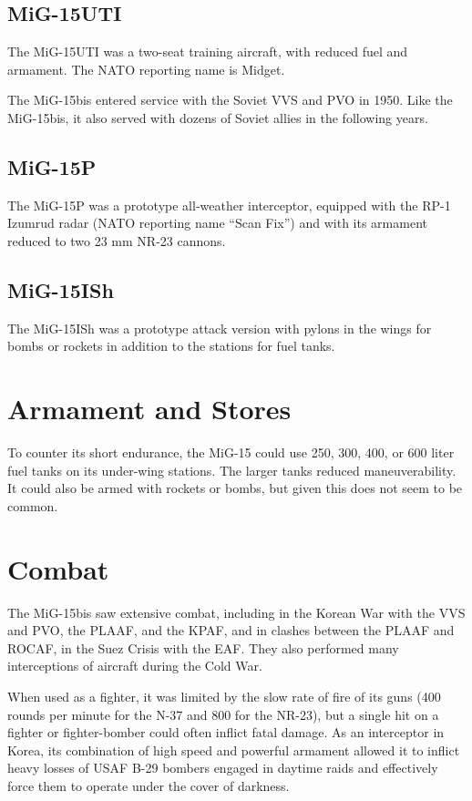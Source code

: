 \subsection{MiG-15UTI}

The MiG-15UTI was a two-seat training aircraft, with reduced fuel and armament. The NATO reporting name is Midget.

The MiG-15bis entered service with the Soviet VVS and PVO in 1950. Like the MiG-15bis, it also served with dozens of Soviet allies in the following years.

\subsection{MiG-15P}

The MiG-15P was a prototype all-weather interceptor, equipped with the RP-1 Izumrud radar (NATO reporting name “Scan Fix”) and with its armament reduced to two 23 mm NR-23 cannons.

\subsection{MiG-15ISh}

The MiG-15ISh was a prototype attack version with pylons in the wings for bombs or rockets in addition to the stations for fuel tanks.

\section{Armament and Stores}

To counter its short endurance, the MiG-15 could use 250, 300, 400, or 600 liter fuel tanks on its under-wing stations. The larger tanks reduced maneuverability. It could also be armed with rockets or bombs, but given this does not seem to be common.

\section{Combat}

The MiG-15bis saw extensive combat, including in the Korean War with the VVS and PVO, the PLAAF, and the KPAF, and in clashes between the PLAAF and ROCAF, in the Suez Crisis with the EAF. They also performed many interceptions of aircraft during the Cold War.

When used as a fighter, it was limited by the slow rate of fire of its guns (400 rounds per minute for the N-37 and 800 for the NR-23), but a single hit on a fighter or fighter-bomber could often inflict fatal damage. As an interceptor in Korea, its combination of high speed and powerful armament allowed it to inflict heavy losses of USAF B-29 bombers engaged in daytime raids and effectively force them to operate under the cover of darkness.

